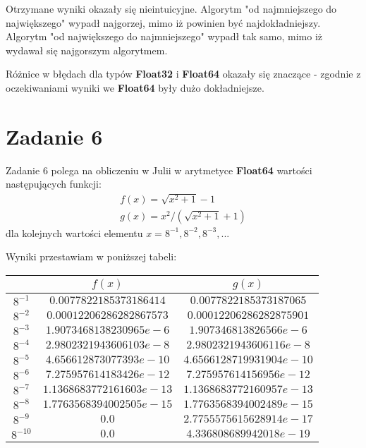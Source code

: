 \documentclass[12pt]{article}
\begin{document}
Otrzymane wyniki okazały się nieintuicyjne. Algorytm "od najmniejszego do największego" wypadł najgorzej, mimo iż powinien być najdokładniejszy. Algorytm "od największego do najmniejszego" wypadł tak samo, mimo iż wydawał się najgorszym algorytmem.

Różnice w błędach dla typów \textbf{Float32} i \textbf{Float64} okazały się znaczące - zgodnie z oczekiwaniami wyniki we \textbf{Float64} były dużo dokładniejsze.

\section{Zadanie 6}
Zadanie 6 polega na obliczeniu w Julii w arytmetyce \textbf{Float64} wartości następujących funkcji:
\begin{align*}
	f(x) = \sqrt{x^2+1}-1 \\
	g(x) = x^2/(\sqrt{x^2+1}+1)
\end{align*}
dla kolejnych wartości elementu $x=8^{-1}, 8^{-2}, 8^{-3}, ...$

Wyniki przestawiam w poniższej tabeli:
\begin{table}[h!]
	\centering
    \label{tab:table1}
    \begin{tabular}{|c|c|c|}
    		\hline
      	& $f(x)$ & $g(x)$\\
      	\hline
      	$8^{-1}$ & $0.0077822185373186414$ & $0.0077822185373187065$\\
		\hline
      	$8^{-2}$ & $0.00012206286282867573$ & $0.00012206286282875901$\\
		\hline
      	$8^{-3}$ & $1.9073468138230965e-6$ & $1.907346813826566e-6$\\
		\hline
      	$8^{-4}$ & $2.9802321943606103e-8$ & $2.9802321943606116e-8$\\
		\hline
      	$8^{-5}$ & $4.656612873077393e-10$ & $4.6566128719931904e-10$\\
		\hline
      	$8^{-6}$ & $7.275957614183426e-12$ & $7.275957614156956e-12$\\
		\hline
      	$8^{-7}$ & $1.1368683772161603e-13$ & $1.1368683772160957e-13$\\
		\hline
      	$8^{-8}$ & $1.7763568394002505e-15$ & $1.7763568394002489e-15$\\
		\hline
      	$8^{-9}$ & $0.0$ & $2.7755575615628914e-17$\\
		\hline
      	$8^{-10}$ & $0.0$ & $4.336808689942018e-19$\\
		\hline
    \end{tabular}
\end{table}
\end{document}
